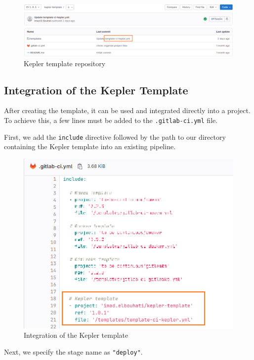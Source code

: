 \begin{figure}[H]
    \centering
    \includegraphics[width=19cm]{Figures/kepler-template-gitlab.png}
    \caption{Kepler template repository}
\end{figure}

\subsection*{Integration of the Kepler Template}

After creating the template, it can be used and integrated directly into a project. To achieve this, a few lines must be added to the \texttt{.gitlab-ci.yml} file.

First, we add the \texttt{include} directive followed by the path to our directory containing the Kepler template into an existing pipeline.

\begin{figure}[H]
  \centering
  \includegraphics[width=13cm]{Figures/kepler-template-integration.png}
  \caption{Integration of the Kepler template}
\end{figure}

Next, we specify the stage name as \texttt{"deploy"}.

